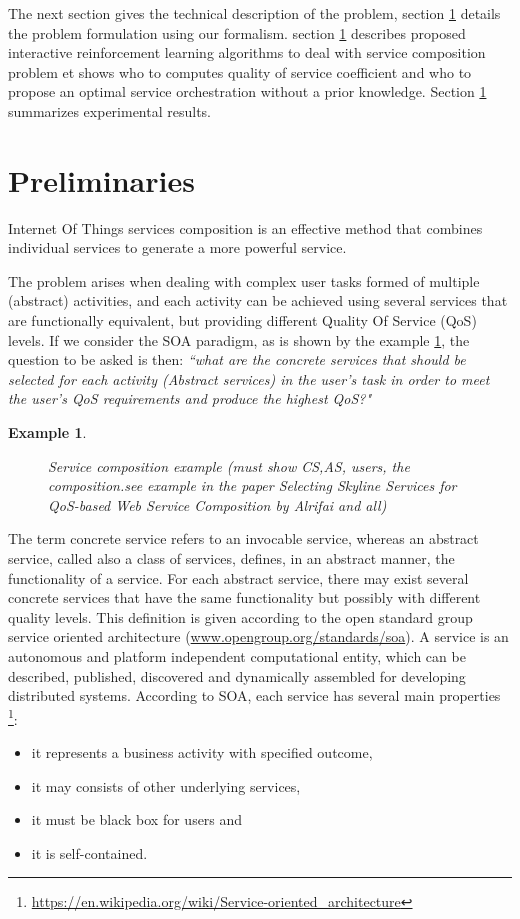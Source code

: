 \documentclass[10pt,journal,compsoc]{IEEEtran}
\newtheorem{example}{Example}
\begin{document}
The next section gives the technical description of the problem, section \ref{} details the problem formulation using our formalism. section \ref{} describes proposed interactive reinforcement learning algorithms to deal with service composition problem et shows who to computes  quality of service coefficient and who to propose an optimal service orchestration without a prior knowledge. Section \ref{} summarizes experimental results.  

\section{Preliminaries }
Internet Of Things  services composition is an effective method that combines individual services to generate a more powerful service. 

The problem arises when dealing with complex user tasks formed of multiple (abstract) activities, and each activity can be achieved using several services that are functionally equivalent, but providing different Quality Of Service (QoS) levels.  If we consider the SOA paradigm, as is shown by the example \ref{exAS}, the question to be asked is then:  \emph{``what are the concrete services that should be selected for each activity (Abstract services) in the user's task in order to meet the user's QoS requirements and produce the highest QoS?"}
\begin{example}
\label{exAS}
\begin{figure}[htpb]
\caption{Service composition example (must show CS,AS, users, the composition.see example in the paper Selecting Skyline Services for QoS-based Web Service Composition by Alrifai and all)}
\centering
\end{figure}
\end{example}

The term concrete service refers to an invocable service, whereas an abstract service, called also a class of services, defines, in an abstract manner, the functionality of a service. For each abstract service, there may exist several concrete services that have the same functionality but possibly with different quality levels.  This definition is given according to the open standard group service oriented architecture (\url{www.opengroup.org/standards/soa}). A service is an autonomous and platform independent computational entity, which can be described, published, discovered and dynamically assembled for developing distributed systems. According to SOA, each service has several main properties \footnote{\url{https://en.wikipedia.org/wiki/Service-oriented_architecture}}: 
\begin{itemize}
\item it represents a business activity with specified outcome,
\item it may consists of other underlying services,
\item it must be black box for users and
\item it is self-contained.
\end{itemize}
\end{document}

